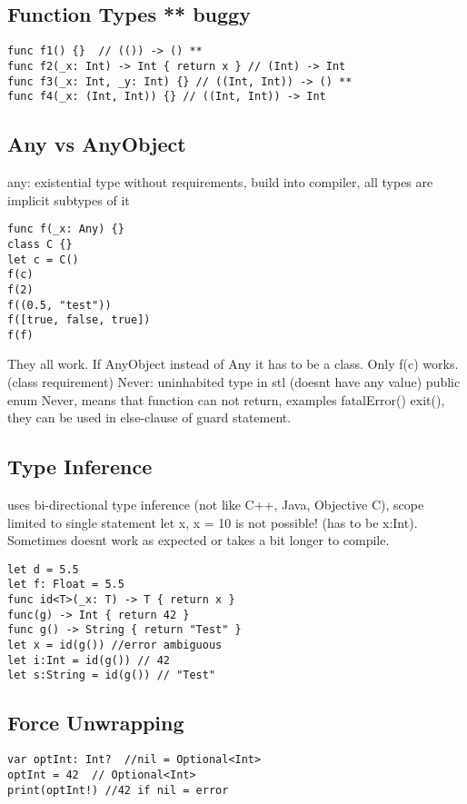 \subsection{Function Types ** buggy}
\begin{lstlisting}
func f1() {}  // (()) -> () **
func f2(_x: Int) -> Int { return x } // (Int) -> Int
func f3(_x: Int, _y: Int) {} // ((Int, Int)) -> () **
func f4(_x: (Int, Int)) {} // ((Int, Int)) -> Int
\end{lstlisting}


\subsection{Any vs AnyObject}
any: existential type without requirements, build into compiler, all types are implicit subtypes of it
\begin{lstlisting}
func f(_x: Any) {}
class C {}
let c = C()
f(c)
f(2)
f((0.5, "test"))
f([true, false, true])
f(f)
\end{lstlisting}
They all work. If AnyObject instead of Any it has to be a class. Only f(c) works. (class requirement)
Never: uninhabited type in stl (doesnt have any value) public enum Never{}, means that function can not return, examples fatalError() exit(), they can be used in else-clause of guard statement.

\subsection{Type Inference}
uses bi-directional type inference (not like C++, Java, Objective C), scope limited to single statement
let x, x = 10 is not possible! (has to be x:Int). Sometimes doesnt work as expected or takes a bit longer to compile.
\begin{lstlisting}
let d = 5.5
let f: Float = 5.5
func id<T>(_x: T) -> T { return x }
func(g) -> Int { return 42 }
func g() -> String { return "Test" }
let x = id(g()) //error ambiguous
let i:Int = id(g()) // 42
let s:String = id(g()) // "Test"
\end{lstlisting}

\subsection{Force Unwrapping}
\begin{lstlisting}
var optInt: Int?  //nil = Optional<Int>
optInt = 42  // Optional<Int>
print(optInt!) //42 if nil = error
\end{lstlisting}


